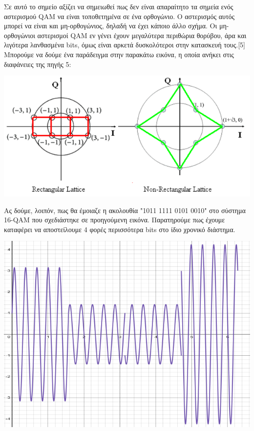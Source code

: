 \documentclass{article}
\begin{document}
Σε αυτό το σημείο αξίζει να σημειωθεί πως δεν είναι απαραίτητο τα σημεία ενός αστερισμού QAM να είναι τοποθετημένα σε ένα ορθογώνιο. Ο αστερισμός αυτός μπορεί να είναι και μη-ορθογώνιος, δηλαδή να έχει κάποιο άλλο σχήμα. Οι μη-ορθογώνιοι αστερισμοί QAM εν γένει έχουν μεγαλύτερα περιθώρια θορύβου, άρα και λιγότερα λανθασμένα bits, όμως είναι αρκετά δυσκολότεροι στην κατασκευή τους.[5] Μπορούμε να δούμε ένα παράδειγμα στην παρακάτω εικόνα, η οποία ανήκει στις διαφάνειες της πηγής 5:
\begin{center}
    \includegraphics[scale=0.6]{image.png}
\end{center}
Ας δούμε, λοιπόν, πως θα έμοιαζε η ακολουθία "1011 1111 0101 0010" στο σύστημα 16-QAM που σχεδιάστηκε σε προηγούμενη εικόνα. Παρατηρούμε πως έχουμε καταφέρει να αποστείλουμε 4 φορές περισσότερα bits στο ίδιο χρονικό διάστημα.
\begin{center}
    \includegraphics[scale=0.7]{diktya_pic7.png}
\end{center}
\end{document}

